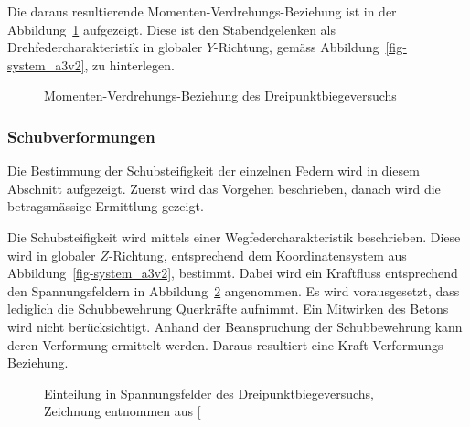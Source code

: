 \documentclass[
  11pt,
  letterpaper,
]{scrreprt}
\begin{document}
Die daraus resultierende Momenten-Verdrehungs-Beziehung ist in der
Abbildung~\ref{fig-mphi_a3v2} aufgezeigt. Diese ist den Stabendgelenken
als Drehfedercharakteristik in globaler \(Y\)-Richtung, gemäss
Abbildung~\ref{fig-system_a3v2}, zu hinterlegen.

\begin{figure}[H]


\caption{\label{fig-mphi_a3v2}Momenten-Verdrehungs-Beziehung des
Dreipunktbiegeversuchs}

\end{figure}%

\subsubsection{Schubverformungen}\label{schubverformungen}

Die Bestimmung der Schubsteifigkeit der einzelnen Federn wird in diesem
Abschnitt aufgezeigt. Zuerst wird das Vorgehen beschrieben, danach wird
die betragsmässige Ermittlung gezeigt.

Die Schubsteifigkeit wird mittels einer Wegfedercharakteristik
beschrieben. Diese wird in globaler \(Z\)-Richtung, entsprechend dem
Koordinatensystem aus Abbildung~\ref{fig-system_a3v2}, bestimmt. Dabei
wird ein Kraftfluss entsprechend den Spannungsfeldern in
Abbildung~\ref{fig-spannungsfelder_a3v2} angenommen. Es wird
vorausgesetzt, dass lediglich die Schubbewehrung Querkräfte aufnimmt.
Ein Mitwirken des Betons wird nicht berücksichtigt. Anhand der
Beanspruchung der Schubbewehrung kann deren Verformung ermittelt werden.
Daraus resultiert eine Kraft-Verformungs-Beziehung.

\begin{figure}[H]


\caption{\label{fig-spannungsfelder_a3v2}Einteilung in Spannungsfelder
des Dreipunktbiegeversuchs, Zeichnung entnommen aus
{[}\citeproc{ref-gitz_ansatze_2024}{1}{]}}

\end{figure}%
\end{document}
